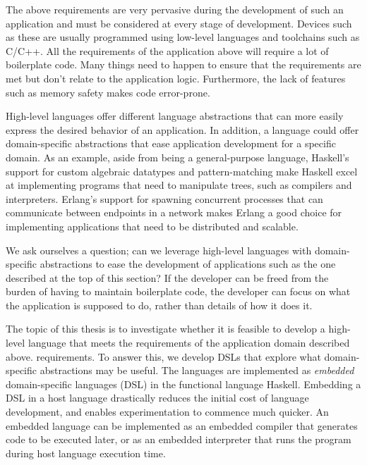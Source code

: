 The above requirements are very pervasive during the development of such an application and must be considered at every stage of
development. Devices such as these are usually programmed using low-level languages and toolchains such as C/C++. All the
requirements of the application above will require a lot of boilerplate code. Many things need to
happen to ensure that the requirements are met but don't relate to the application logic. Furthermore, the lack of features
such as memory safety makes code error-prone.

High-level languages offer different language abstractions that can more easily express the desired behavior of an application.
In addition, a language could offer domain-specific abstractions that ease application development for a specific domain.
As an example, aside from being a general-purpose language, Haskell's support for custom algebraic datatypes and pattern-matching
make Haskell excel at implementing programs that need to manipulate trees, such as compilers and interpreters. Erlang's support
for spawning concurrent processes that can communicate between endpoints in a network makes Erlang a good choice for implementing
applications that need to be distributed and scalable.

We ask ourselves a question; can we leverage high-level languages with domain-specific abstractions to ease the
development of applications such as the one described at the top of this section? If the developer can be freed from the burden
of having to maintain boilerplate code, the developer can focus on what the application is supposed to do, rather than
details of how it does it.

The topic of this thesis is to investigate whether it is feasible to develop a high-level language that meets the requirements
of the application domain described above.
requirements. To
answer this, we develop DSLs that explore what domain-specific abstractions may be useful. The languages are
implemented as \textit{embedded} domain-specific languages (DSL) in the functional language Haskell. Embedding a DSL in a host
language drastically reduces the initial cost of language development, and enables experimentation to commence much quicker. An
embedded language can be implemented as an embedded compiler that generates code to be executed later, or as an embedded
interpreter that runs the program during host language execution time.

